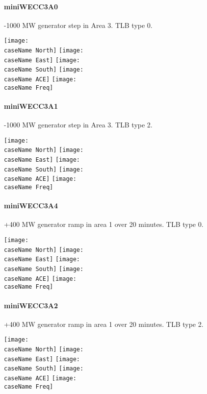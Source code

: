 \documentclass[12pt]{article}
\newcommand{\caseName}{ }
\begin{document}
\renewcommand{\caseName}{miniWECC3A0}
\paragraph{miniWECC3A0} -1000 MW generator step in Area 3. TLB type 0.

	\texttt{[image: \\caseName North]}
	\texttt{[image: \\caseName East]} 
	\texttt{[image: \\caseName South]} 
	\texttt{[image: \\caseName ACE]} 
	\texttt{[image: \\caseName Freq]} 
	
\pagebreak

\renewcommand{\caseName}{miniWECC3A1}
\paragraph{miniWECC3A1} -1000 MW generator step in Area 3. TLB type 2.

	\texttt{[image: \\caseName North]}
	\texttt{[image: \\caseName East]} 
	\texttt{[image: \\caseName South]} 
	\texttt{[image: \\caseName ACE]} 
	\texttt{[image: \\caseName Freq]} 

\pagebreak

\renewcommand{\caseName}{miniWECC3A4}
\paragraph{miniWECC3A4} +400 MW generator ramp in area 1 over 20 minutes. TLB type 0.

	\texttt{[image: \\caseName North]}
	\texttt{[image: \\caseName East]} 
	\texttt{[image: \\caseName South]} 
	\texttt{[image: \\caseName ACE]} 
	\texttt{[image: \\caseName Freq]} 
	
\pagebreak


\renewcommand{\caseName}{miniWECC3A2}
\paragraph{miniWECC3A2} +400 MW generator ramp in area 1 over 20 minutes. TLB type 2.

	\texttt{[image: \\caseName North]}
	\texttt{[image: \\caseName East]} 
	\texttt{[image: \\caseName South]} 
	\texttt{[image: \\caseName ACE]} 
	\texttt{[image: \\caseName Freq]} 
	
\end{document}
